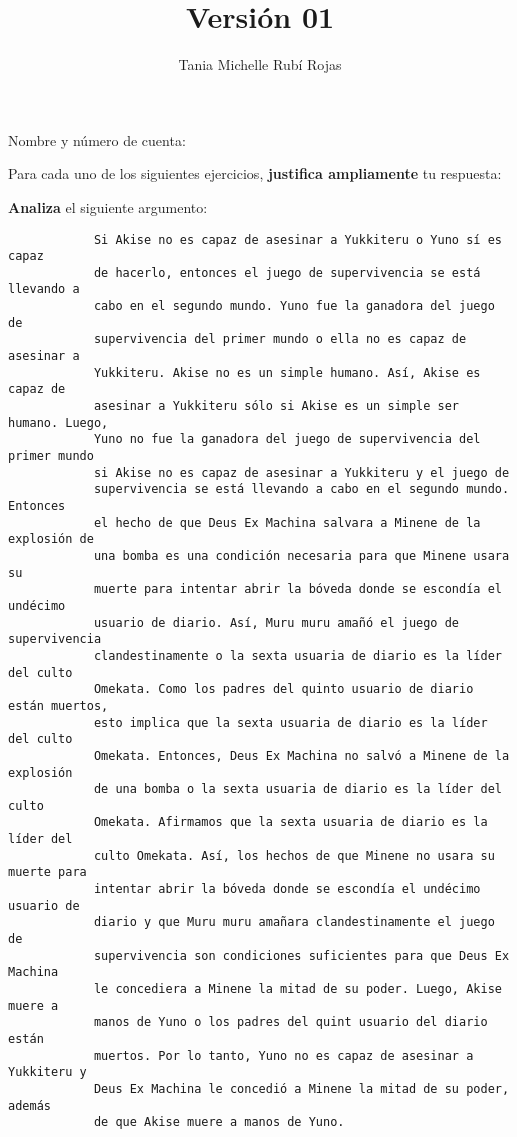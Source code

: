 \documentclass[oneside]{style}
\title{Versión 01}
\author{Tania Michelle Rubí Rojas}
\begin{document}
\maketitle

\vspace{5mm}
\noindent
Nombre y número de cuenta: \hrulefill\

\vspace*{5mm}
Para cada uno de los siguientes ejercicios, \textbf{justifica ampliamente} tu 
respuesta:

\begin{questions}[label=\protect\circled{\bfseries\arabic*}]

    \question
    {
        \textbf{Analiza} el siguiente argumento:
        \begin{verbatim}
            Si Akise no es capaz de asesinar a Yukkiteru o Yuno sí es capaz 
            de hacerlo, entonces el juego de supervivencia se está llevando a 
            cabo en el segundo mundo. Yuno fue la ganadora del juego de 
            supervivencia del primer mundo o ella no es capaz de asesinar a 
            Yukkiteru. Akise no es un simple humano. Así, Akise es capaz de 
            asesinar a Yukkiteru sólo si Akise es un simple ser humano. Luego, 
            Yuno no fue la ganadora del juego de supervivencia del primer mundo 
            si Akise no es capaz de asesinar a Yukkiteru y el juego de 
            supervivencia se está llevando a cabo en el segundo mundo. Entonces 
            el hecho de que Deus Ex Machina salvara a Minene de la explosión de 
            una bomba es una condición necesaria para que Minene usara su 
            muerte para intentar abrir la bóveda donde se escondía el undécimo 
            usuario de diario. Así, Muru muru amañó el juego de supervivencia 
            clandestinamente o la sexta usuaria de diario es la líder del culto 
            Omekata. Como los padres del quinto usuario de diario están muertos, 
            esto implica que la sexta usuaria de diario es la líder del culto 
            Omekata. Entonces, Deus Ex Machina no salvó a Minene de la explosión
            de una bomba o la sexta usuaria de diario es la líder del culto 
            Omekata. Afirmamos que la sexta usuaria de diario es la líder del 
            culto Omekata. Así, los hechos de que Minene no usara su muerte para 
            intentar abrir la bóveda donde se escondía el undécimo usuario de 
            diario y que Muru muru amañara clandestinamente el juego de 
            supervivencia son condiciones suficientes para que Deus Ex Machina 
            le concediera a Minene la mitad de su poder. Luego, Akise muere a 
            manos de Yuno o los padres del quint usuario del diario están 
            muertos. Por lo tanto, Yuno no es capaz de asesinar a Yukkiteru y 
            Deus Ex Machina le concedió a Minene la mitad de su poder, además 
            de que Akise muere a manos de Yuno.  
        \end{verbatim}

}
\end{questions}
\end{document}
